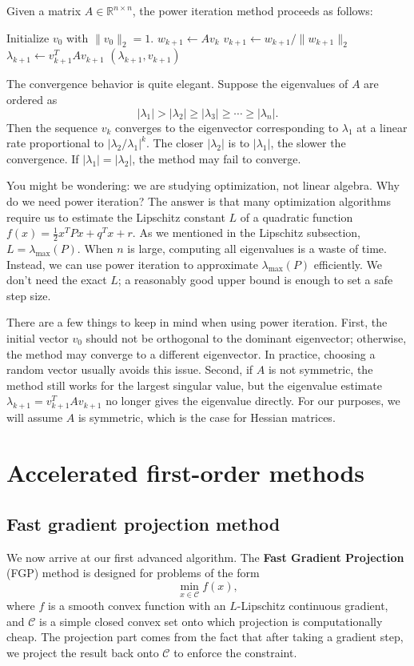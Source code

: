 \documentclass[lang=en,color=blue,mode=fancy,titlestyle=hang]{elegantbook}
\begin{document}
Given a matrix $A \in \mathbb{R}^{n \times n}$, the power iteration method proceeds as follows:
\begin{algorithm}[H]
\caption{Power Iteration method}
\begin{algorithmic}
\State Initialize $v_0$ with $\|v_0\|_2 = 1$.
  \State $w_{k+1} \gets A v_k$
  \State $v_{k+1} \gets w_{k+1} / \|w_{k+1}\|_2$
  \State $\lambda_{k+1} \gets v_{k+1}^T A v_{k+1}$
\EndWhile
\State \Return $(\lambda_{k+1}, v_{k+1})$
\end{algorithmic}
\end{algorithm}

The convergence behavior is quite elegant. Suppose the eigenvalues of $A$ are ordered as
\[
|\lambda_1| > |\lambda_2| \ge |\lambda_3| \ge \cdots \ge |\lambda_n|.
\]
Then the sequence $v_k$ converges to the eigenvector corresponding to $\lambda_1$ at a linear rate
proportional to $|\lambda_2 / \lambda_1|^k$. The closer $|\lambda_2|$ is to $|\lambda_1|$, the slower
the convergence. If $|\lambda_1| = |\lambda_2|$, the method may fail to converge.

You might be wondering: we are studying optimization, not linear algebra. Why do we need power iteration?
The answer is that many optimization algorithms require us to estimate the Lipschitz constant $L$ of a
quadratic function $f(x) = \frac12 x^T P x + q^T x + r$. As we mentioned in the Lipschitz subsection,
$L = \lambda_{\max}(P)$. When $n$ is large, computing all eigenvalues is a waste of time. Instead,
we can use power iteration to approximate $\lambda_{\max}(P)$ efficiently. We don't need the exact $L$;
a reasonably good upper bound is enough to set a safe step size.

There are a few things to keep in mind when using power iteration. First, the initial vector $v_0$
should not be orthogonal to the dominant eigenvector; otherwise, the method may converge to a
different eigenvector. In practice, choosing a random vector usually avoids this issue. Second,
if $A$ is not symmetric, the method still works for the largest singular value, but the eigenvalue
estimate $\lambda_{k+1} = v_{k+1}^T A v_{k+1}$ no longer gives the eigenvalue directly. For our
purposes, we will assume $A$ is symmetric, which is the case for Hessian matrices.

\section{Accelerated first-order methods}
\subsection{Fast gradient projection method}
We now arrive at our first advanced algorithm. The \textbf{Fast Gradient Projection} (FGP) method
is designed for problems of the form
\[
\min_{x \in \mathcal{C}} f(x),
\]
where $f$ is a smooth convex function with an $L$-Lipschitz continuous gradient, and $\mathcal{C}$
is a simple closed convex set onto which projection is computationally cheap. The projection
part comes from the fact that after taking a gradient step, we project the result back onto
$\mathcal{C}$ to enforce the constraint.
\end{document}
